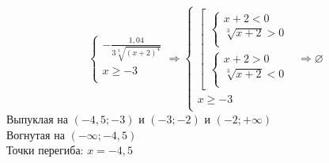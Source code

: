 \documentclass{article}
\begin{document}
    \begin{equation*}
    \begin{cases}
        - \frac{1,04}{3 \sqrt[3]{(x+2)^4}} \\ 
        x \geq -3 \\
    \end{cases}
    \Rightarrow
    \begin{cases}
        \left[ 
          \begin{gathered} 
            \begin{cases}
                x + 2 < 0 \\
                \sqrt[3]{x+2} > 0 \\            
            \end{cases} \\
            \begin{cases}
                x + 2 > 0 \\
                \sqrt[3]{x+2} < 0 \\            
            \end{cases}
          \end{gathered} 
        \right. \\
        x \geq -3 \\
    \end{cases}
    \Rightarrow
    \varnothing
    \end{equation*}
    Выпуклая на $(-4,5; -3)$ и $(-3; -2)$ и $(-2; + \infty)$ \\
    Вогнутая на $(- \infty; -4,5)$ \\
    Точки перегиба: $x=-4,5$
    


\newpage   
\end{document}
